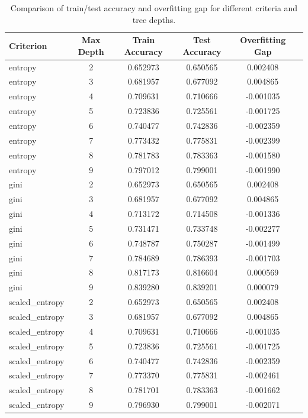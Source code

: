 \documentclass{article}
\begin{document}
\begin{table}[H]
\centering
\renewcommand{\arraystretch}{1.2}
\begin{tabular}{|l|c|c|c|c|c|}
\hline
\textbf{Criterion} & \textbf{Max Depth} & \textbf{Train Accuracy} & \textbf{Test Accuracy} & \textbf{Overfitting Gap} \\
\hline
entropy         & 2 & 0.652973 & 0.650565 & 0.002408 \\
entropy         & 3 & 0.681957 & 0.677092 & 0.004865 \\
entropy         & 4 & 0.709631 & 0.710666 & -0.001035 \\
entropy         & 5 & 0.723836 & 0.725561 & -0.001725 \\
entropy         & 6 & 0.740477 & 0.742836 & -0.002359 \\
entropy         & 7 & 0.773432 & 0.775831 & -0.002399 \\
entropy         & 8 & 0.781783 & 0.783363 & -0.001580 \\
entropy         & 9 & 0.797012 & 0.799001 & -0.001990 \\
\hline
gini            & 2 & 0.652973 & 0.650565 & 0.002408 \\
gini            & 3 & 0.681957 & 0.677092 & 0.004865 \\
gini            & 4 & 0.713172 & 0.714508 & -0.001336 \\
gini            & 5 & 0.731471 & 0.733748 & -0.002277 \\
gini            & 6 & 0.748787 & 0.750287 & -0.001499 \\
gini            & 7 & 0.784689 & 0.786393 & -0.001703 \\
gini            & 8 & 0.817173 & 0.816604 & 0.000569 \\
gini            & 9 & 0.839280 & 0.839201 & 0.000079 \\
\hline
scaled\_entropy & 2 & 0.652973 & 0.650565 & 0.002408 \\
scaled\_entropy & 3 & 0.681957 & 0.677092 & 0.004865 \\
scaled\_entropy & 4 & 0.709631 & 0.710666 & -0.001035 \\
scaled\_entropy & 5 & 0.723836 & 0.725561 & -0.001725 \\
scaled\_entropy & 6 & 0.740477 & 0.742836 & -0.002359 \\
scaled\_entropy & 7 & 0.773370 & 0.775831 & -0.002461 \\
scaled\_entropy & 8 & 0.781701 & 0.783363 & -0.001662 \\
scaled\_entropy & 9 & 0.796930 & 0.799001 & -0.002071 \\
\hline
\end{tabular}
\caption{Comparison of train/test accuracy and overfitting gap for different criteria and tree depths.}
\label{tab:accuracy_comparison}
\end{table}
\end{document}
